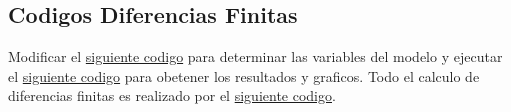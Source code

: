 \subsection{Codigos Diferencias Finitas}

Modificar el \href{https://github.com/LukasWolff2002/ENTREGA_3_MCOC/blob/main/CODIGO/LAPLACE/variables.py}{siguiente codigo} para determinar las variables del modelo y ejecutar el \href{https://github.com/LukasWolff2002/ENTREGA_3_MCOC/blob/main/CODIGO/LAPLACE/main.py}{siguiente codigo} para obetener los resultados y graficos. Todo el calculo de diferencias finitas es realizado por el \href{https://github.com/LukasWolff2002/ENTREGA_3_MCOC/blob/main/CODIGO/LAPLACE/laplace_solver.py}{siguiente codigo}. 



    
